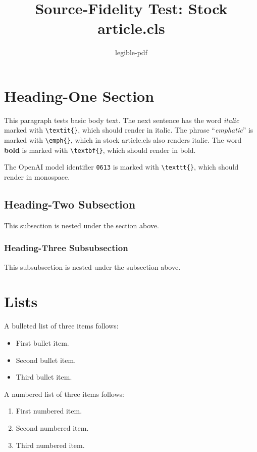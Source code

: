 \documentclass{article}
\title{Source-Fidelity Test: Stock article.cls}
\author{legible-pdf}
\date{}
\begin{document}
\maketitle

\section{Heading-One Section}

This paragraph tests basic body text. The next sentence has the word \textit{italic} marked
with \texttt{\textbackslash textit\{\}}, which should render in italic. The phrase
``\emph{emphatic}'' is marked with \texttt{\textbackslash emph\{\}}, which in stock
article.cls also renders italic. The word \textbf{bold} is marked with
\texttt{\textbackslash textbf\{\}}, which should render in bold.

The OpenAI model identifier \texttt{0613} is marked with \texttt{\textbackslash texttt\{\}},
which should render in monospace.

\subsection{Heading-Two Subsection}

This subsection is nested under the section above.

\subsubsection{Heading-Three Subsubsection}

This subsubsection is nested under the subsection above.

\section{Lists}

A bulleted list of three items follows:

\begin{itemize}
    \item First bullet item.
    \item Second bullet item.
    \item Third bullet item.
\end{itemize}

A numbered list of three items follows:

\begin{enumerate}
    \item First numbered item.
    \item Second numbered item.
    \item Third numbered item.
\end{enumerate}
\end{document}
